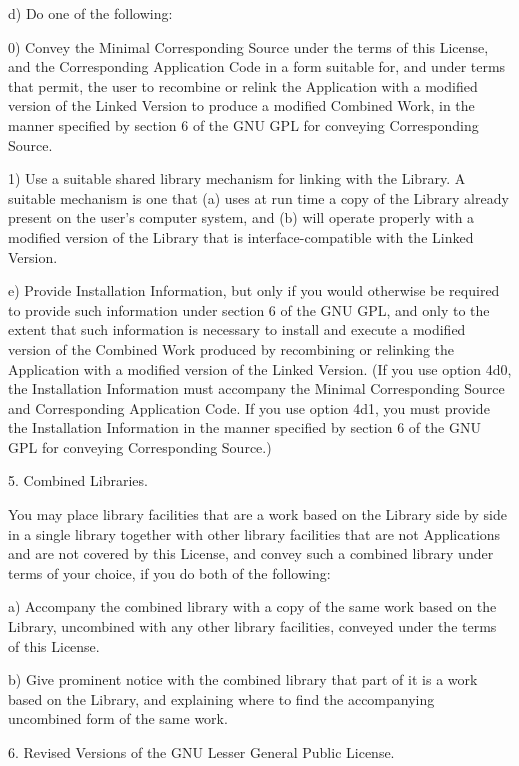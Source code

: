 \begin{DoxyVerbInclude}
   d) Do one of the following:

       0) Convey the Minimal Corresponding Source under the terms of this
       License, and the Corresponding Application Code in a form
       suitable for, and under terms that permit, the user to
       recombine or relink the Application with a modified version of
       the Linked Version to produce a modified Combined Work, in the
       manner specified by section 6 of the GNU GPL for conveying
       Corresponding Source.

       1) Use a suitable shared library mechanism for linking with the
       Library.  A suitable mechanism is one that (a) uses at run time
       a copy of the Library already present on the user's computer
       system, and (b) will operate properly with a modified version
       of the Library that is interface-compatible with the Linked
       Version.

   e) Provide Installation Information, but only if you would otherwise
   be required to provide such information under section 6 of the
   GNU GPL, and only to the extent that such information is
   necessary to install and execute a modified version of the
   Combined Work produced by recombining or relinking the
   Application with a modified version of the Linked Version. (If
   you use option 4d0, the Installation Information must accompany
   the Minimal Corresponding Source and Corresponding Application
   Code. If you use option 4d1, you must provide the Installation
   Information in the manner specified by section 6 of the GNU GPL
   for conveying Corresponding Source.)

  5. Combined Libraries.

  You may place library facilities that are a work based on the
Library side by side in a single library together with other library
facilities that are not Applications and are not covered by this
License, and convey such a combined library under terms of your
choice, if you do both of the following:

   a) Accompany the combined library with a copy of the same work based
   on the Library, uncombined with any other library facilities,
   conveyed under the terms of this License.

   b) Give prominent notice with the combined library that part of it
   is a work based on the Library, and explaining where to find the
   accompanying uncombined form of the same work.

  6. Revised Versions of the GNU Lesser General Public License.


\end{DoxyVerbInclude}
